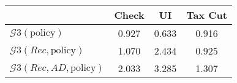 \begin{tabular}{@{}lccc@{}} 
\toprule 
                          & Check      & UI    & Tax Cut    \\  \midrule 
$\mathcal{G}3(\text{policy})$ & 0.927  & 0.633  & 0.916     \\ 
$\mathcal{G}3(Rec,\text{policy})$ & 1.070  & 2.434  & 0.925     \\ 
$\mathcal{G}3(Rec, AD,\text{policy})$ & 2.033  & 3.285  & 1.307     \\ 
\end{tabular}  
